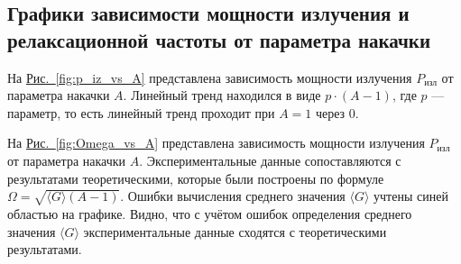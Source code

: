 \documentclass[12pt]{article}
\newcommand*{\figref}[2][]{\hyperref[#2]{Рис.~\ref*{#2}#1}}
\begin{document}
	\subsection{Графики зависимости мощности излучения и релаксационной частоты от параметра накачки}

	На \figref{fig:p_iz_vs_A} представлена зависимость мощности излучения $P_\text{изл}$ от параметра накачки $A$. Линейный тренд находился в виде $p\cdot(A - 1)$, где $p$ --- параметр, то есть линейный тренд проходит при $A=1$ через 0.

	

	На \figref{fig:Omega_vs_A} представлена зависимость мощности излучения $P_\text{изл}$ от параметра накачки $A$. Экспериментальные данные сопоставляются с результатами теоретическими, которые были построены по формуле $\Omega=\sqrt{\langle G \rangle (A-1)}$. Ошибки вычисления среднего значения $\langle G \rangle$ учтены синей областью на графике. Видно, что с учётом ошибок определения среднего значения $\langle G \rangle$ экспериментальные данные сходятся с теоретическими результатами.
\end{document}
